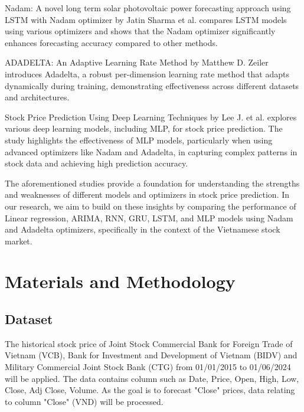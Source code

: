\documentclass{ieeeojies}
\begin{document}
Nadam: A novel long term solar photovoltaic power forecasting approach using LSTM with Nadam optimizer by Jatin Sharma et al. compares LSTM models using various optimizers and shows that the Nadam optimizer significantly enhances forecasting accuracy compared to other methods. \cite{b4} 

ADADELTA: An Adaptive Learning Rate Method by Matthew D. Zeiler introduces Adadelta, a robust per-dimension learning rate method that adapts dynamically during training, demonstrating effectiveness across different datasets and architectures. \cite{b5} 

Stock Price Prediction Using Deep Learning Techniques by Lee J. et al. explores various deep learning models, including MLP, for stock price prediction. The study highlights the effectiveness of MLP models, particularly when using advanced optimizers like Nadam and Adadelta, in capturing complex patterns in stock data and achieving high prediction accuracy. \cite{b6}

The aforementioned studies provide a foundation for understanding the strengths and weaknesses of different models and optimizers in stock price prediction. In our research, we aim to build on these insights by comparing the performance of Linear regression, ARIMA, RNN, GRU, LSTM, and MLP models using Nadam and Adadelta optimizers, specifically in the context of the Vietnamese stock market.

\section{Materials and Methodology}
\subsection{Dataset}
The historical stock price of Joint Stock Commercial Bank for Foreign Trade of Vietnam (VCB), Bank for Investment and Development of Vietnam (BIDV) and Military Commercial Joint Stock Bank (CTG) from 01/01/2015 to 01/06/2024 will be applied. The data contains column such as Date, Price, Open, High, Low, Close, Adj Close, Volume. As the goal is to forecast "Close" prices, data relating to column "Close" (VND) will be processed.
\end{document}
